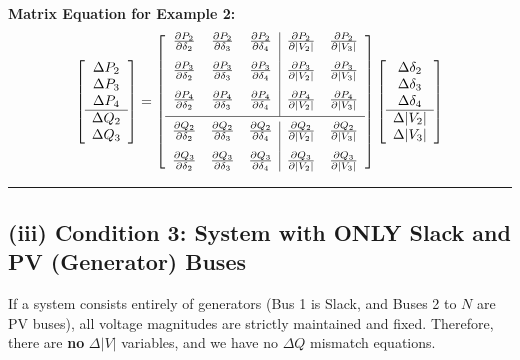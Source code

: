 \documentclass[11pt]{article}
\begin{document}
\textbf{Matrix Equation for Example 2:}
\begin{equation*}
    \left[ \begin{array}{c} 
    \Delta P_2 \\ \Delta P_3 \\ \Delta P_4 \\ \hline
    \Delta Q_2 \\ \Delta Q_3
    \end{array} \right] 
    = 
    \left[ \begin{array}{ccc | cc} 
    \frac{\partial P_2}{\partial \delta_2} & \frac{\partial P_2}{\partial \delta_3} & \frac{\partial P_2}{\partial \delta_4} & \frac{\partial P_2}{\partial |V_2|} & \frac{\partial P_2}{\partial |V_3|} \\[0.3cm]
    \frac{\partial P_3}{\partial \delta_2} & \frac{\partial P_3}{\partial \delta_3} & \frac{\partial P_3}{\partial \delta_4} & \frac{\partial P_3}{\partial |V_2|} & \frac{\partial P_3}{\partial |V_3|} \\[0.3cm]
    \frac{\partial P_4}{\partial \delta_2} & \frac{\partial P_4}{\partial \delta_3} & \frac{\partial P_4}{\partial \delta_4} & \frac{\partial P_4}{\partial |V_2|} & \frac{\partial P_4}{\partial |V_3|} \\[0.2cm] \hline \\[-0.3cm]
    \frac{\partial Q_2}{\partial \delta_2} & \frac{\partial Q_2}{\partial \delta_3} & \frac{\partial Q_2}{\partial \delta_4} & \frac{\partial Q_2}{\partial |V_2|} & \frac{\partial Q_2}{\partial |V_3|} \\[0.3cm]
    \frac{\partial Q_3}{\partial \delta_2} & \frac{\partial Q_3}{\partial \delta_3} & \frac{\partial Q_3}{\partial \delta_4} & \frac{\partial Q_3}{\partial |V_2|} & \frac{\partial Q_3}{\partial |V_3|}
    \end{array} \right]
    \left[ \begin{array}{c} 
    \Delta \delta_2 \\ \Delta \delta_3 \\ \Delta \delta_4 \\ \hline
    \Delta |V_2| \\ \Delta |V_3|
    \end{array} \right]
\end{equation*}

\vspace{0.5cm}
\hrule
\vspace{0.5cm}

\subsection*{(iii) Condition 3: System with ONLY Slack and PV (Generator) Buses}
If a system consists entirely of generators (Bus 1 is Slack, and Buses 2 to $N$ are PV buses), all voltage magnitudes are strictly maintained and fixed. Therefore, there are \textbf{no} $\Delta |V|$ variables, and we have no $\Delta Q$ mismatch equations.
\end{document}
